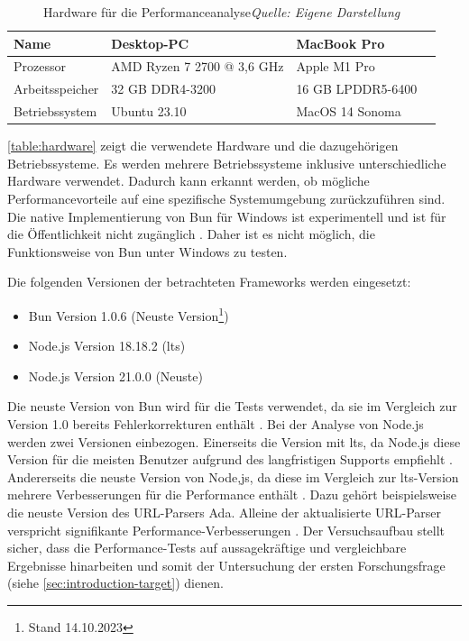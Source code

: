 \begin{table}[h]
	\caption[Hardware für die Performanceanalyse]{Hardware für die Performanceanalyse\protect\linebreak\textit{Quelle: Eigene Darstellung}}
	\label{table:hardware}
	\centering
	\begin{tabular}{|p{4.5cm}|p{4.5cm}|p{4.5cm}|p{4.5cm}|}
		\hline
		Name & Desktop-PC & MacBook Pro \\
		\hline
		Prozessor & AMD Ryzen 7 2700 @ 3,6 GHz & Apple M1 Pro \\
		\hline
		Arbeitsspeicher & 32 GB DDR4-3200 & 16 GB LPDDR5-6400 \\
		\hline
		Betriebssystem & Ubuntu 23.10 & MacOS 14 Sonoma \\
		\hline
	\end{tabular}
\end{table}

\noindent
\autoref{table:hardware} zeigt die verwendete Hardware und die dazugehörigen Betriebssysteme. Es werden mehrere Betriebssysteme inklusive unterschiedliche Hardware verwendet. Dadurch kann erkannt werden, ob mögliche Performancevorteile auf eine spezifische Systemumgebung zurückzuführen sind. Die native Implementierung von Bun für Windows ist experimentell und ist für die Öffentlichkeit nicht zugänglich \cite{Verhelst.2023}. Daher ist es nicht möglich, die Funktionsweise von Bun unter Windows zu testen.

\noindent
Die folgenden Versionen der betrachteten Frameworks werden eingesetzt:
\begin{itemize}
	\item Bun Version 1.0.6 (Neuste Version\footnote{Stand 14.10.2023\label{footnote:Stand}})
	\item Node.js Version 18.18.2 (\ac{lts}) 
	\item Node.js Version 21.0.0 (Neuste)
\end{itemize}

\noindent
Die neuste Version von Bun wird für die Tests verwendet, da sie im Vergleich zur Version 1.0 bereits Fehlerkorrekturen enthält \cite{Sumner.2023b}. Bei der Analyse von Node.js werden zwei Versionen einbezogen. Einerseits die Version mit \ac{lts}, da Node.js diese Version für die meisten Benutzer aufgrund des langfristigen Supports empfiehlt \cite{OpenJSFoundation.o.J.}. Andererseits die neuste Version von Node,js, da diese im Vergleich zur \ac{lts}-Version mehrere Verbesserungen für die Performance enthält \cite{OpenJSFoundation.2023b}. Dazu gehört beispielsweise die neuste Version des URL-Parsers Ada. Alleine der aktualisierte URL-Parser verspricht signifikante Performance-Verbesserungen \cite{OpenJSFoundation.2023}.\newline
Der Versuchsaufbau stellt sicher, dass die Performance-Tests auf aussagekräftige und vergleichbare Ergebnisse hinarbeiten und somit der Untersuchung der ersten Forschungsfrage (siehe \autoref{sec:introduction-target}) dienen.

